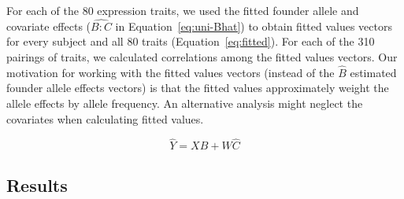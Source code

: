 \documentclass[oneside]{book}
\begin{document}
For each of the 80 expression traits, we used the fitted founder allele and covariate effects ($\widehat{B:C}$ in Equation~\ref{eq:uni-Bhat}) to obtain fitted values vectors for every subject and all 80 traits (Equation~\ref{eq:fitted}). For each of the 310 pairings of traits, we calculated correlations among the fitted values vectors. Our motivation for working with the fitted values vectors (instead of the $\hat B$ estimated founder allele effects vectors) is that the fitted values approximately weight the allele effects by allele frequency. An alternative analysis might neglect the covariates when calculating fitted values.

\begin{equation}\label{eq:fitted}
\hat Y = X\hat B + W \hat C
\end{equation}


\subsection{Results}
\end{document}
